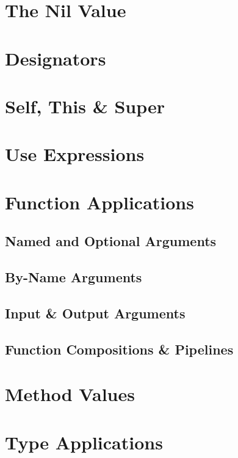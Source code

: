 \section{The Nil Value}

\section{Designators}

\section{Self, This \& Super}
\label{sec:self-this-super}

\section{Use Expressions}
\label{sec:use-expressions}

\section{Function Applications}
\label{sec:function-applications}

\subsection{Named and Optional Arguments}
\label{sec:named-optional-arguments}

\subsection{By-Name Arguments}
\label{sec:by-name-arguments}

\subsection{Input \& Output Arguments}
\label{sec:io-arguments}

\subsection{Function Compositions \& Pipelines}

\section{Method Values}

\section{Type Applications}

